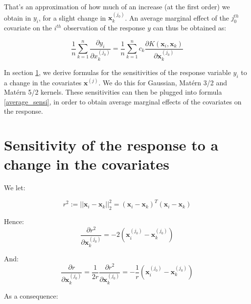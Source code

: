 \medskip

That's an approximation of how much of an increase (at the first order) we obtain in $y_i$,  for a slight change in $\textbf{x}_k^{(j_0)}$. An average marginal effect of the $j_0^{th}$ covariate on the $i^{th}$ observation of the response $y$ can thus be obtained as:

\begin{equation}
\label{average_sensi}
\frac{1}{n}\sum_{k = 1}^n \frac{\partial y_i}{\partial x_k^{(j_0)}} = \frac{1}{n}\sum_{k = 1}^n c_k \frac{\partial K(\textbf{x}_i, \textbf{x}_k)}{\partial \textbf{x}_k^{(j_0)}}
\end{equation}

\medskip

In section \ref{sec:sensitivity}, we derive formulas for the sensitivities of the response variable $y_i$ to a change in the covariates $\textbf{x}^{(j)}$. We do this for Gaussian, Mat\'ern 3/2 and Mat\'ern 5/2 kernels. These sensitivities can then be plugged into formula \ref{average_sensi}, in order to obtain average marginal effects of the covariates on the response.

\section{Sensitivity of the response to a change in the covariates}
\label{sec:sensitivity}

We let:

$$
r^2 := || \textbf{x}_i - \textbf{x}_k ||^2_2 = (\textbf{x}_i - \textbf{x}_k)^T(\textbf{x}_i - \textbf{x}_k)
$$

Hence:
$$
\frac{\partial r^2}{\partial \textbf{x}_k^{(j_0)}} = -2\left(\textbf{x}_i^{(j_0)} - \textbf{x}_k^{(j_0)} \right)
$$

And:
$$
\frac{\partial r}{\partial \textbf{x}_k^{(j_0)}} = \frac{1}{2r}\frac{\partial r^2}{\partial \textbf{x}_k^{(j_0)}} = -\frac{1}{r}\left(\textbf{x}_i^{(j_0)} - \textbf{x}_k^{(j_0)} \right)
$$

\medskip

As a consequence: 

